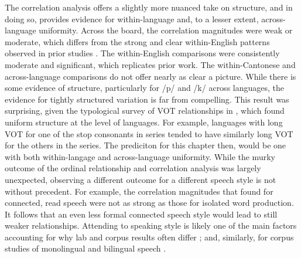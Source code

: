 The correlation analysis offers a slightly more nuanced take on structure, and in doing so, provides evidence for within-language and, to a lesser extent, across-language uniformity. Across the board, the correlation magnitudes were weak or moderate, which differs from the strong and clear within-English patterns observed in prior studies \citep{chodroff_2017_structure, chodroff_2019_l2}. The within-English comparisons were consistently moderate and significant, which replicates prior work. The within-Cantonese and across-language comparisons do not offer nearly as clear a picture. While there is some evidence of structure, particularly for /p/ and /k/ across languages, the evidence for tightly structured variation is far from compelling. This result was surprising, given the typological survey of VOT relationships in \citet{chodroff_2019_covariation}, which found uniform structure at the level of languages. For example, languages with long VOT for one of the stop consonants in series tended to have similarly long VOT for the others in the series. The prediciton for this chapter then, would be one with both within-langage and across-language uniformity. While the murky outcome of the ordinal relationship and correlation analysis was largely unexpected, observing a different outcome for a different speech style is not without precedent. For example, the correlation magnitudes that \citet{chodroff_2017_structure} found for connected, read speech were not as strong as those for isolated word production. It follows that an even less formal connected speech style would lead to still weaker relationships. Attending to speaking style is likely one of the main factors accounting for why lab and corpus results often differ \citep{gahl_2012_reduce,chodroff_2017_structure}; and, similarly, for corpus studies of monolingual and bilingual speech \citep{johnson_2019_probabilistic}. 

